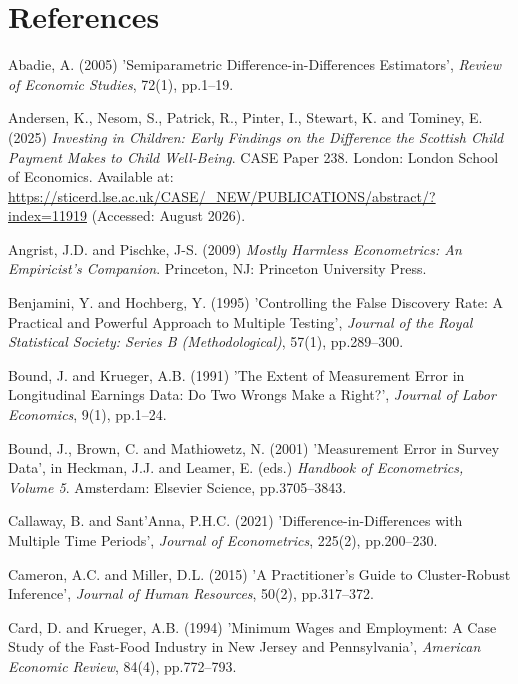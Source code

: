 \clearpage
\section*{References}

\noindent\hangindent=1.27cm Abadie, A. (2005) 'Semiparametric Difference-in-Differences Estimators', \textit{Review of Economic Studies}, 72(1), pp.1--19.
\medskip

\noindent\hangindent=1.27cm Andersen, K., Nesom, S., Patrick, R., Pinter, I., Stewart, K. and Tominey, E. (2025) \textit{Investing in Children: Early Findings on the Difference the Scottish Child Payment Makes to Child Well-Being}. CASE Paper 238. London: London School of Economics. Available at: \url{https://sticerd.lse.ac.uk/CASE/_NEW/PUBLICATIONS/abstract/?index=11919} (Accessed: August 2026).
\medskip

\noindent\hangindent=1.27cm Angrist, J.D. and Pischke, J-S. (2009) \textit{Mostly Harmless Econometrics: An Empiricist's Companion}. Princeton, NJ: Princeton University Press.
\medskip

\noindent\hangindent=1.27cm Benjamini, Y. and Hochberg, Y. (1995) 'Controlling the False Discovery Rate: A Practical and Powerful Approach to Multiple Testing', \textit{Journal of the Royal Statistical Society: Series B (Methodological)}, 57(1), pp.289--300.
\medskip

\noindent\hangindent=1.27cm Bound, J. and Krueger, A.B. (1991) 'The Extent of Measurement Error in Longitudinal Earnings Data: Do Two Wrongs Make a Right?', \textit{Journal of Labor Economics}, 9(1), pp.1--24.
\medskip

\noindent\hangindent=1.27cm Bound, J., Brown, C. and Mathiowetz, N. (2001) 'Measurement Error in Survey Data', in Heckman, J.J. and Leamer, E. (eds.) \textit{Handbook of Econometrics, Volume 5}. Amsterdam: Elsevier Science, pp.3705--3843.
\medskip

\noindent\hangindent=1.27cm Callaway, B. and Sant'Anna, P.H.C. (2021) 'Difference-in-Differences with Multiple Time Periods', \textit{Journal of Econometrics}, 225(2), pp.200--230.
\medskip

\noindent\hangindent=1.27cm Cameron, A.C. and Miller, D.L. (2015) 'A Practitioner's Guide to Cluster-Robust Inference', \textit{Journal of Human Resources}, 50(2), pp.317--372.
\medskip

\noindent\hangindent=1.27cm Card, D. and Krueger, A.B. (1994) 'Minimum Wages and Employment: A Case Study of the Fast-Food Industry in New Jersey and Pennsylvania', \textit{American Economic Review}, 84(4), pp.772--793.
\medskip

